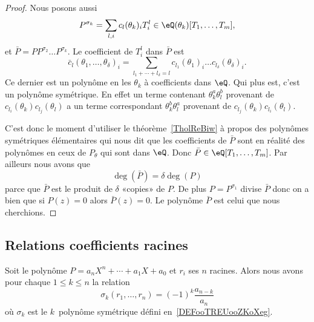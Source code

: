 \begin{proof}
	Nous posons aussi
	\begin{equation}
		P^{\sigma_k}=\sum_{l,i} c_l(\theta_k)_iT_i^l\in \eQ(\theta_k)[T_1,\ldots, T_m],
	\end{equation}
	et \( \bar P=PP^{\sigma_2}\ldots P^{\sigma_k}\). Le coefficient de \( T_i^l\) dans \( \bar P\) est
	\begin{equation}
		\bar c_l(\theta_1,\ldots, \theta_{\delta})_i=\sum_{l_1+\cdots +l_{\delta}=l}c_{l_1}(\theta_1)_i\ldots c_{l_{\delta}}(\theta_{\delta})_i.
	\end{equation}
	Ce dernier est un polynôme en les \( \theta_k\) à coefficients dans \( \eQ\). Qui plus est, c'est un polynôme symétrique. En effet un terme contenant \( \theta_k^a\theta_l^b\) provenant de \( c_{l_i}(\theta_k)c_{l_j}(\theta_l)\) a un terme correspondant \( \theta_k^b\theta_l^a\) provenant de \( c_{l_j}(\theta_k)c_{l_i}(\theta_l)\).

	C'est donc le moment d'utiliser le théorème~\ref{TholReBiw} à propos des polynômes symétriques élémentaires qui nous dit que les coefficients de \( \bar P\) sont en réalité des polynômes en ceux de \( P_{\theta}\) qui sont dans \( \eQ\). Donc \( \bar P\in \eQ[T_1,\ldots, T_m]\). Par ailleurs nous avons que
	\begin{equation}
		\deg(\bar P)=\delta \deg(P)
	\end{equation}
	parce que \( \bar P\) est le produit de \( \delta\) «copies»  de \( P\). De plus \( P=P^{\sigma_1}\) divise \( \bar P \) donc on a bien que si \( P(z)=0\) alors \( \bar P(z)=0\). Le polynôme \( \bar P\) est celui que nous cherchions.
\end{proof}

\subsection{Relations coefficients racines}

\begin{theorem} \label{ThoOQRgjpl}
	Soit le polynôme \( P=a_nX^n+\cdots +a_1X+a_0\) et \( r_i\) ses \( n\) racines. Alors nous avons pour chaque \( 1\leq k\leq n\) la relation
	\begin{equation}
		\sigma_k(r_1,\ldots, r_n)=(-1)^k\frac{ a_{n-k} }{ a_n }
	\end{equation}
	où \( \sigma_k\) est le \( k\)\ieme\ polynôme symétrique défini en~\ref{DEFooTREUooZKoXeg}.
\end{theorem}

